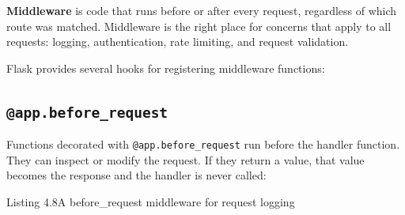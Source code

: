 \textbf{Middleware} is code that runs before or after every request, regardless of which route was matched. Middleware is the right place for concerns that apply to all requests: logging, authentication, rate limiting, and request validation.

Flask provides several hooks for registering middleware functions:

\subsection*{\texorpdfstring{\texttt{@app.before\_request}}{@app.before\_request}}\label{04-request-handling-paths:appbefore-request}

Functions decorated with \texttt{@app.before\_request} run before the handler function. They can inspect or modify the request. If they return a value, that value becomes the response and the handler is never called:

\begin{codeboxcap}[short]{\textcolor{accent}{Listing 4.8}\enspace A before\_request middleware for request logging}

\begin{Shaded}
\begin{Highlighting}[]

\OperatorTok{=}\NormalTok{)}

\OperatorTok{=}
    \NormalTok{(}\SpecialCharTok{\{}\SpecialCharTok{\}}\SpecialStringTok{ }\SpecialCharTok{\{}\SpecialCharTok{\}}\NormalTok{)}

    \OperatorTok{==} \NormalTok{:}
         
            \NormalTok{: }\NormalTok{\}), }
\end{Highlighting}
\end{Shaded}

\end{codeboxcap}

